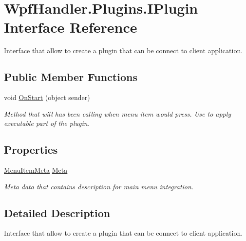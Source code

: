 \hypertarget{interface_wpf_handler_1_1_plugins_1_1_i_plugin}{}\section{Wpf\+Handler.\+Plugins.\+I\+Plugin Interface Reference}
\label{interface_wpf_handler_1_1_plugins_1_1_i_plugin}


Interface that allow to create a plugin that can be connect to client application.  


\subsection*{Public Member Functions}
\begin{DoxyCompactItemize}
\item 
void \mbox{\hyperlink{interface_wpf_handler_1_1_plugins_1_1_i_plugin_aabe1a8e5680ebeb37f96ffe86b6123e9}{On\+Start}} (object sender)
\begin{DoxyCompactList}\small\item\em Method that will has been calling when menu item would press. Use to apply executable part of the plugin. \end{DoxyCompactList}\end{DoxyCompactItemize}
\subsection*{Properties}
\begin{DoxyCompactItemize}
\item 
\mbox{\hyperlink{class_wpf_handler_1_1_plugins_1_1_menu_item_meta}{Menu\+Item\+Meta}} \mbox{\hyperlink{interface_wpf_handler_1_1_plugins_1_1_i_plugin_a654e20458e4e44b69c9de0be25a8d9af}{Meta}}
\begin{DoxyCompactList}\small\item\em Meta data that contains description for main menu integration. \end{DoxyCompactList}\end{DoxyCompactItemize}


\subsection{Detailed Description}
Interface that allow to create a plugin that can be connect to client application. 



